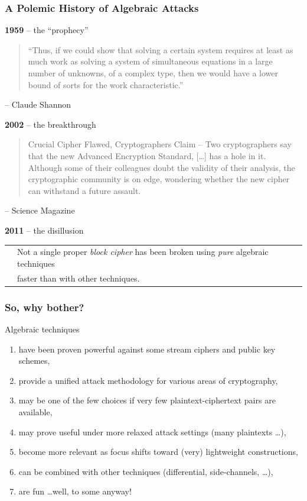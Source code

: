 \documentclass[9pt]{beamer}
\begin{document}
\begin{frame}
\frametitle{A Polemic History of Algebraic Attacks}
\textbf{1959} -- the ``prophecy''
\begin{quote}
``Thus, if we could show that solving a certain system requires at least as much work as solving a system of
simultaneous equations in a large number of unknowns, of a complex type, then we would have a lower bound of sorts for
the work characteristic.'' 
\end{quote}
\begin{flushright}
\vspace{-2em}
-- Claude Shannon
\end{flushright}

\textbf{2002} -- the breakthrough
\begin{quote}
Crucial Cipher Flawed, Cryptographers Claim -- Two cryptographers say that the new Advanced Encryption Standard, [\dots] has a hole in it. Although some of their colleagues doubt the validity of their analysis, the cryptographic community is on edge, wondering whether the new cipher can withstand a future assault.
\end{quote}
\begin{flushright}
\vspace{-2em}
-- Science Magazine
\end{flushright}

\textbf{2011} -- the disillusion

\vspace{0.8em}

\begin{tabular}{ll}
\hspace{0.05cm} & Not a single proper \emph{block cipher} has been broken using \textit{pure} algebraic techniques\\ & faster than with other techniques.
\end{tabular}
\end{frame}

\begin{frame}
\frametitle{So, why bother?}

Algebraic techniques 
\begin{enumerate}
 \item have been proven powerful against some stream ciphers and public key schemes,
 \item provide a unified attack methodology for various areas of cryptography,
 \item may be one of the few choices if very few plaintext-ciphertext pairs are available,
 \item may prove useful under more relaxed attack settings (many plaintexts \dots),
 \item become more relevant as focus shifts toward (very) lightweight constructions,
 \item can be combined with other techniques (differential, side-channels, \dots),
 \item are fun \dots well, to some anyway!
\end{enumerate}
 
\end{frame}
\end{document}
